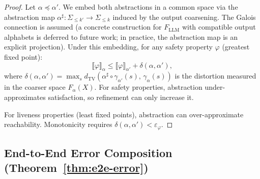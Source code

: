 \documentclass[11pt]{article}
\begin{document}
\begin{proof}
Let $\alpha \preceq \alpha'$.  We embed both abstractions in a common
space via the abstraction map $\alpha^\sharp: \Sigma_{\le k'} \to
\Sigma_{\le k}$ induced by the output coarsening.  The Galois
connection is assumed (a concrete construction for $F_{\mathrm{LLM}}$
with compatible output alphabets is deferred to future work;
in practice, the abstraction map is an explicit projection).
Under this embedding, for
any safety property $\varphi$ (greatest fixed point):
\[
  \llbracket \varphi \rrbracket_{\alpha}
  \le \llbracket \varphi \rrbracket_{\alpha'}
  + \delta(\alpha, \alpha'),
\]
where $\delta(\alpha, \alpha') = \max_s d_{\mathrm{TV}}(\alpha^\sharp
\circ \gamma_{\alpha'}(s),\, \gamma_{\alpha}(s))$
is the distortion measured in the coarser space $F_\alpha(X)$.
For safety properties, abstraction
under-approximates satisfaction, so refinement can only increase it.

For liveness properties (least fixed points), abstraction can
over-approximate reachability.  Monotonicity requires
$\delta(\alpha, \alpha') < \varepsilon_\varphi$.
\end{proof}

\subsection{End-to-End Error Composition (Theorem~\ref{thm:e2e-error})}
\label{app:error-composition}
\end{document}
